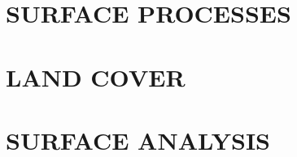 \documentclass[11pt]{book}
\begin{document}
\part{SURFACE PROCESSES}







\part{LAND COVER}


\part{SURFACE ANALYSIS}

\end{document}
